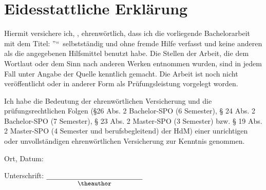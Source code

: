 \chapter*{Eidesstattliche Erklärung}

Hiermit versichere ich, \theauthor, ehrenwörtlich, dass ich die vorliegende Bachelorarbeit mit dem Titel: \textquotedblright\thetitle\textquotedblleft\ selbstständig und ohne fremde  Hilfe verfasst und keine anderen als die angegebenen Hilfsmittel benutzt habe. Die Stellen der Arbeit, die dem Wortlaut oder dem Sinn  nach anderen Werken entnommen wurden, sind in jedem Fall unter Angabe der Quelle kenntlich gemacht. Die Arbeit ist noch nicht veröffentlicht oder in anderer Form als Prüfungsleistung vorgelegt worden.


Ich habe die Bedeutung der ehrenwörtlichen Versicherung und die prüfungsrechtlichen Folgen (§26 Abs. 2 Bachelor-SPO (6 Semester), § 24 Abs. 2 Bachelor-SPO (7 Semester), § 23 Abs. 2  Master-SPO (3 Semester) bzw. § 19 Abs. 2 Master-SPO (4 Semester und berufsbegleitend) der HdM)  einer unrichtigen oder unvollständigen ehrenwörtlichen Versicherung zur Kenntnis genommen.

\bigskip\bigskip\bigskip
\noindent Ort, Datum: \underline{\hphantom{01.01.2020, Lüdenscheidt-West}}

\bigskip\bigskip\bigskip
\noindent Unterschrift: $\underset{\text{\small\theauthor}}{\underline{\hphantom{\text{01.01.2020, Lüdenscheidt-West}}}}$